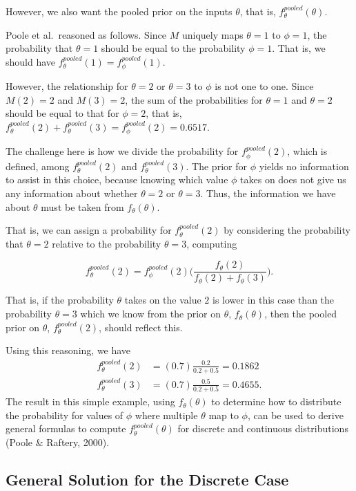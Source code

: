 \documentclass[12pt,twoside]{smiththesis}
\begin{document}
However, we also want the pooled prior on the inputs \(\theta\), that is, \(f_\theta^{pooled}(\theta)\).

Poole et al.~reasoned as follows. Since \(M\) uniquely maps \(\theta=1\) to \(\phi =1\), the probability that \(\theta=1\) should be equal to the probability \(\phi = 1\). That is, we should have \(f_\theta^{pooled}(1) = f_\phi^{pooled}(1)\).

However, the relationship for \(\theta=2\) or \(\theta=3\) to \(\phi\) is not one to one. Since \(M(2)=2\) and \(M(3)=2\), the sum of the probabilities for \(\theta=1\) and \(\theta=2\) should be equal to that for \(\phi=2\), that is, \(f_\theta^{pooled}(2) + f_\theta^{pooled}(3) = f_\phi^{pooled}(2) = 0.6517\).

The challenge here is how we divide the probability for \(f_\phi^{pooled}(2)\), which is defined, among \(f_\theta^{pooled}(2)\) and \(f_\theta^{pooled}(3)\). The prior for \(\phi\) yields no information to assist in this choice, because knowing which value \(\phi\) takes on does not give us any information about whether \(\theta=2\) or \(\theta=3\). Thus, the information we have about \(\theta\) must be taken from \(f_\theta(\theta)\).

That is, we can assign a probability for \(f_\theta^{pooled}(2)\) by considering the probability that \(\theta = 2\) relative to the probability \(\theta =3\), computing

\[f_\theta^{pooled}(2) = f_\phi^{pooled}(2) \Big( \frac{f_\theta(2)}{f_\theta(2) + f_\theta(3)}\Big).\]

That is, if the probability \(\theta\) takes on the value \(2\) is lower in this case than the probability \(\theta=3\) which we know from the prior on \(\theta\), \(f_\theta(\theta)\), then the pooled prior on \(\theta\), \(f_\theta^{pooled}(2)\), should reflect this.

Using this reasoning, we have
\begin{align*} f_\theta^{pooled}(2) &= (0.7) \frac{0.2}{0.2+0.5} = 0.1862\\
f_\theta^{pooled}(3) &= (0.7) \frac{0.5}{0.2+0.5} = 0.4655.
\end{align*}
The result in this simple example, using \(f_\theta(\theta)\) to determine how to distribute the probability for values of \(\phi\) where multiple \(\theta\) map to \(\phi\), can be used to derive general formulas to compute \(f_\theta^{pooled}(\theta)\) for discrete and continuous distributions (Poole \& Raftery, 2000).

\hypertarget{general-solution-for-the-discrete-case}{%
\subsection{General Solution for the Discrete Case}\label{general-solution-for-the-discrete-case}}
\end{document}
